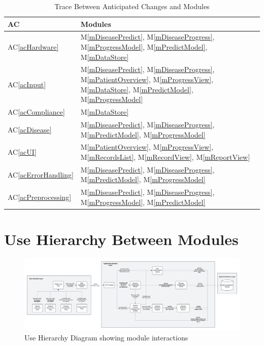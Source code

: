 \documentclass[12pt, titlepage]{article}
\newcommand{\acref}[1]{AC\ref{#1}}
\newcommand{\mref}[1]{M\ref{#1}}
\begin{document}
\begin{table}[H]
\centering
\begin{tabular}{p{} p{}}
\toprule
\textbf{AC} & \textbf{Modules}\\
\midrule
\acref{acHardware} & \mref{mDiseasePredict}, \mref{mDiseaseProgress}, \mref{mProgressModel}, \mref{mPredictModel}, \mref{mDataStore}\\
\acref{acInput} & \mref{mDiseasePredict}, \mref{mDiseaseProgress}, \mref{mPatientOverview}, \mref{mProgressView}, \mref{mDataStore}, \mref{mPredictModel}, \mref{mProgressModel}\\
\acref{acCompliance} & \mref{mDataStore}\\
\acref{acDisease} & \mref{mDiseasePredict}, \mref{mDiseaseProgress}, \mref{mPredictModel}, \mref{mProgressModel}\\
\acref{acUI} & \mref{mPatientOverview}, \mref{mProgressView}, \mref{mRecordsList}, \mref{mRecordView}, \mref{mReportView}\\
\acref{acErrorHandling} & \mref{mDiseasePredict}, \mref{mDiseaseProgress}, \mref{mPredictModel}, \mref{mProgressModel}\\
\acref{acPreprocessing} & \mref{mDiseasePredict}, \mref{mDiseaseProgress}, \mref{mProgressModel}, \mref{mPredictModel}\\
\bottomrule
\end{tabular}
\caption{Trace Between Anticipated Changes and Modules}
\label{TblACT}
\end{table}

\section{Use Hierarchy Between Modules} \label{SecUse}

\begin{figure}[H]
\centering
\includegraphics[width=1.1\textwidth]{../../assets/ContextDesignFlow.png}
\caption{Use Hierarchy Diagram showing module interactions}
\label{FigUH}
\end{figure}
\end{document}
